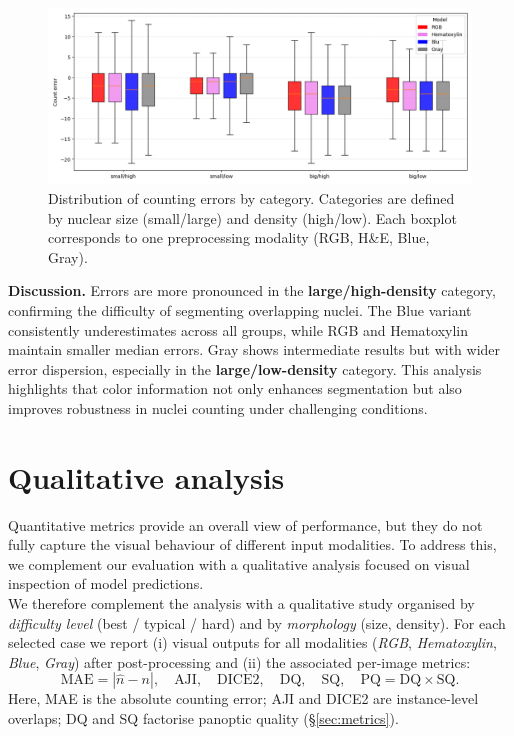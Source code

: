 \documentclass[target=bach,aauheader=,style=]{thud}
\begin{document}
\begin{figure}[h]
    \centering
    \includegraphics[width=\textwidth]{imgs/boxplot.png}
    \caption{Distribution of counting errors by category. Categories are defined by nuclear size (small/large) and density (high/low). Each boxplot corresponds to one preprocessing modality (RGB, H\&E, Blue, Gray).}
    \label{fig:boxplot_categories}
\end{figure}

\noindent\textbf{Discussion.} 
Errors are more pronounced in the \textbf{large/high-density} category, confirming the difficulty of segmenting overlapping nuclei. 
The Blue variant consistently underestimates across all groups, while RGB and Hematoxylin maintain smaller median errors. 
Gray shows intermediate results but with wider error dispersion, especially in the \textbf{large/low-density} category. 
This analysis highlights that color information not only enhances segmentation but also improves robustness in nuclei counting under challenging conditions.
\section{Qualitative analysis}
\label{sec:qualitative}

Quantitative metrics provide an overall view of performance, but they do not fully capture the visual behaviour of different input modalities. To address this, we complement our evaluation with a qualitative analysis focused on visual inspection of model predictions.\\
We therefore complement the analysis with a qualitative study organised by \emph{difficulty level} (best / typical / hard) and by \emph{morphology} (size, density). 
For each selected case we report (i) visual outputs for all modalities (\emph{RGB}, \emph{Hematoxylin}, \emph{Blue}, \emph{Gray}) after post-processing and (ii) the associated per-image metrics:
\[
\text{MAE} = |\hat{n}-n|,\quad
\text{AJI},\quad
\text{DICE2},\quad
\text{DQ},\quad
\text{SQ},\quad
\text{PQ}=\text{DQ}\times\text{SQ}.
\]
Here, MAE is the absolute counting error; AJI and DICE2 are instance-level overlaps; DQ and SQ factorise panoptic quality (\S\ref{sec:metrics}).
\end{document}

